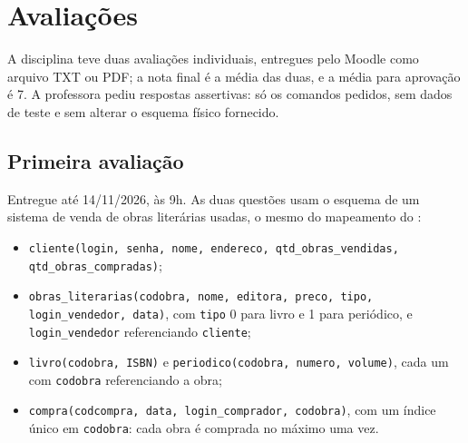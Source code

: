 \setchapterpreamble[u]{\margintoc}
\chapter{Avaliações}

A disciplina teve duas avaliações individuais, entregues pelo Moodle como
arquivo TXT ou PDF; a nota final é a média das duas, e a média para
aprovação é 7. A professora pediu respostas assertivas: só os comandos
pedidos, sem dados de teste e sem alterar o esquema físico fornecido.

\section{Primeira avaliação}

Entregue até 14/11/2026, às 9h. As duas questões usam o esquema de um
sistema de venda de obras literárias usadas, o mesmo do mapeamento do
:

\begin{itemize}
	\item \texttt{cliente(login, senha, nome, endereco,
	qtd\_obras\_vendidas, qtd\_obras\_compradas)};
	\item \texttt{obras\_literarias(codobra, nome, editora, preco, tipo,
	login\_vendedor, data)}, com \texttt{tipo} 0 para livro e 1 para
	periódico, e \texttt{login\_vendedor} referenciando \texttt{cliente};
	\item \texttt{livro(codobra, ISBN)} e \texttt{periodico(codobra,
	numero, volume)}, cada um com \texttt{codobra} referenciando a obra;
	\item \texttt{compra(codcompra, data, login\_comprador, codobra)}, com
	um índice único em \texttt{codobra}: cada obra é comprada no máximo
	uma vez.
\end{itemize}

